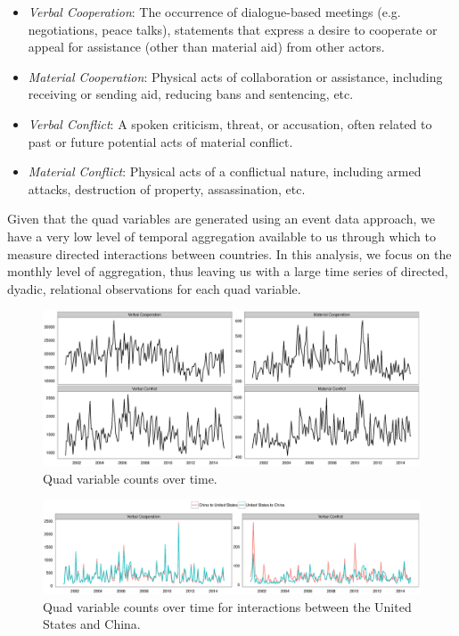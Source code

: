 \documentclass[3p,times,twocolumn,authoryear,12pt]{elsarticle}
\begin{document}
\begin{itemize}
	\item \emph{Verbal Cooperation}: The occurrence of dialogue-based meetings (e.g. negotiations, peace talks), statements that express a desire to cooperate or appeal for assistance (other than material aid) from other actors.
	\item \emph{Material Cooperation}: Physical acts of collaboration or assistance, including receiving or sending aid, reducing bans and sentencing, etc.
	\item \emph{Verbal Conflict}: A spoken criticism, threat, or accusation, often related to past or future potential acts of material conflict.
	\item \emph{Material Conflict}: Physical acts of a conflictual nature, including armed attacks, destruction of property, assassination, etc.
\end{itemize}

Given that the quad variables are generated using an event data approach, we have a very low level of temporal aggregation available to us through which to measure directed interactions between countries. In this analysis, we focus on the monthly level of aggregation, thus leaving us with a large time series of directed, dyadic, relational observations for each quad variable. 

\begin{figure}[ht]
	\centering
	\includegraphics[width=1\textwidth]{dvMonthly}
	\caption{Quad variable counts over time.}
	\label{fig:dvAgg}
\end{figure}

\begin{figure}[ht]
	\centering
	\includegraphics[width=1\textwidth]{US_CHN_Monthly}
	\caption{Quad variable counts over time for interactions between the United States and China.}
	\label{fig:dvParticular}
\end{figure}
\end{document}

